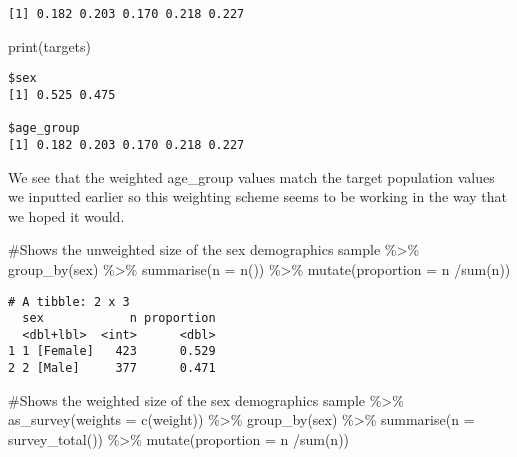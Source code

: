 \documentclass[
  letterpaper,
  DIV=11,
  numbers=noendperiod]{scrreprt}
\newenvironment{Shaded}{\begin{snugshade}}{\end{snugshade}}
\newcommand{\AttributeTok}[1]{\textcolor[rgb]{0.40,0.45,0.13}{#1}}
\newcommand{\CommentTok}[1]{\textcolor[rgb]{0.37,0.37,0.37}{#1}}
\newcommand{\FunctionTok}[1]{\textcolor[rgb]{0.28,0.35,0.67}{#1}}
\newcommand{\NormalTok}[1]{\textcolor[rgb]{0.00,0.23,0.31}{#1}}
\newcommand{\SpecialCharTok}[1]{\textcolor[rgb]{0.37,0.37,0.37}{#1}}
\begin{document}
\begin{Shaded}
\end{Shaded}

\begin{verbatim}
[1] 0.182 0.203 0.170 0.218 0.227
\end{verbatim}

\begin{Shaded}
\begin{Highlighting}[]
\FunctionTok{print}\NormalTok{(targets)}
\end{Highlighting}
\end{Shaded}

\begin{verbatim}
$sex
[1] 0.525 0.475

$age_group
[1] 0.182 0.203 0.170 0.218 0.227
\end{verbatim}

We see that the weighted age\_group values match the target population
values we inputted earlier so this weighting scheme seems to be working
in the way that we hoped it would.

\begin{Shaded}
\begin{Highlighting}[]
\CommentTok{\#Shows the unweighted size of the sex demographics}
\NormalTok{sample }\SpecialCharTok{\%\textgreater{}\%}
  \FunctionTok{group\_by}\NormalTok{(sex) }\SpecialCharTok{\%\textgreater{}\%}
  \FunctionTok{summarise}\NormalTok{(}\AttributeTok{n =} \FunctionTok{n}\NormalTok{()) }\SpecialCharTok{\%\textgreater{}\%} 
  \FunctionTok{mutate}\NormalTok{(}\AttributeTok{proportion =}\NormalTok{ n }\SpecialCharTok{/}\FunctionTok{sum}\NormalTok{(n))}
\end{Highlighting}
\end{Shaded}

\begin{verbatim}
# A tibble: 2 x 3
  sex            n proportion
  <dbl+lbl>  <int>      <dbl>
1 1 [Female]   423      0.529
2 2 [Male]     377      0.471
\end{verbatim}

\begin{Shaded}
\begin{Highlighting}[]
\CommentTok{\#Shows the weighted size of the sex demographics}
\NormalTok{sample }\SpecialCharTok{\%\textgreater{}\%}
  \FunctionTok{as\_survey}\NormalTok{(}\AttributeTok{weights =} \FunctionTok{c}\NormalTok{(weight)) }\SpecialCharTok{\%\textgreater{}\%}
  \FunctionTok{group\_by}\NormalTok{(sex) }\SpecialCharTok{\%\textgreater{}\%}
  \FunctionTok{summarise}\NormalTok{(}\AttributeTok{n =} \FunctionTok{survey\_total}\NormalTok{()) }\SpecialCharTok{\%\textgreater{}\%} 
  \FunctionTok{mutate}\NormalTok{(}\AttributeTok{proportion =}\NormalTok{ n }\SpecialCharTok{/}\FunctionTok{sum}\NormalTok{(n))}
\end{Highlighting}
\end{Shaded}
\end{document}
